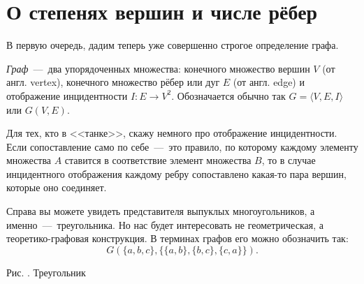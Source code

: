 \section{О степенях вершин и числе рёбер}
	
	
	В первую очередь, дадим теперь уже совершенно строгое определение графа.

\begin{definition}
	\emph{Граф}~---~два упорядоченных множества: конечного множество вершин $V$ (от англ. vertex), 
	конечного множество рёбер или дуг $E$ (от англ. edge) и отображение инцидентности $I: E \to V^2$. 
	Обозначается обычно так $G = \langle V, E, I\rangle$ или $G(V, E)$.
\end{definition}

	Для тех, кто в <<танке>>, скажу немного про отображение инцидентности. Если сопоставление само по 
	себе~---~это правило, по которому каждому элементу множества $A$ ставится в соответствие элемент множества $B$, 
	то в случае инцидентного отображения каждому ребру сопоставлено какая-то пара вершин, которые оно соединяет.

\begin{paracol}{2}
\begin{example}
	Справа вы можете увидеть представителя выпуклых многоугольников, а именно~---~треугольника. Но нас будет 
	интересовать не геометрическая, а теоретико-графовая конструкция. В терминах графов его можно обозначить так:
	$$G(\lbrace a, b, c\rbrace, \lbrace \lbrace a, b\rbrace, \lbrace b, c\rbrace, \lbrace c, a\rbrace \rbrace).$$
\end{example}

\switchcolumn

\begin{center}

	\small Рис. \images. Треугольник
\end{center}
\end{paracol}

